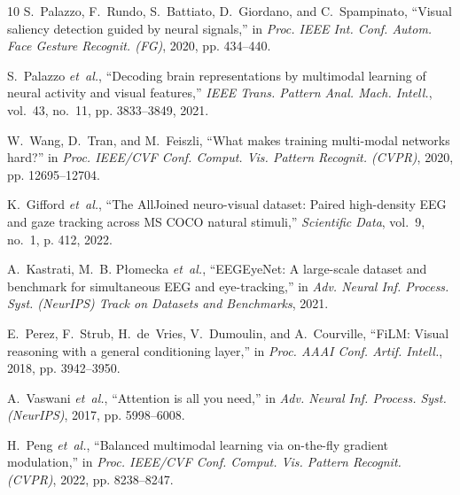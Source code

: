 \documentclass[journal,twocolumn]{IEEEtran}
\begin{document}
\begin{thebibliography}{10}
S.~Palazzo, F.~Rundo, S.~Battiato, D.~Giordano, and C.~Spampinato, ``Visual saliency detection guided by neural signals,'' in \emph{Proc. IEEE Int. Conf. Autom. Face Gesture Recognit. (FG)}, 2020, pp. 434--440.

S.~Palazzo \emph{et~al.}, ``Decoding brain representations by multimodal learning of neural activity and visual features,'' \emph{IEEE Trans. Pattern Anal. Mach. Intell.}, vol.~43, no.~11, pp. 3833--3849, 2021.

W.~Wang, D.~Tran, and M.~Feiszli, ``What makes training multi-modal networks hard?'' in \emph{Proc. IEEE/CVF Conf. Comput. Vis. Pattern Recognit. (CVPR)}, 2020, pp. 12695--12704.

K.~Gifford \emph{et~al.}, ``The {AllJoined} neuro-visual dataset: Paired high-density {EEG} and gaze tracking across {MS COCO} natural stimuli,'' \emph{Scientific Data}, vol.~9, no.~1, p. 412, 2022.

A.~Kastrati, M.~B. P{\l}omecka \emph{et~al.}, ``{EEGEyeNet}: A large-scale dataset and benchmark for simultaneous {EEG} and eye-tracking,'' in \emph{Adv. Neural Inf. Process. Syst. (NeurIPS) Track on Datasets and Benchmarks}, 2021.

E.~Perez, F.~Strub, H.~de~Vries, V.~Dumoulin, and A.~Courville, ``{FiLM}: Visual reasoning with a general conditioning layer,'' in \emph{Proc. AAAI Conf. Artif. Intell.}, 2018, pp. 3942--3950.

A.~Vaswani \emph{et~al.}, ``Attention is all you need,'' in \emph{Adv. Neural Inf. Process. Syst. (NeurIPS)}, 2017, pp. 5998--6008.

H.~Peng \emph{et~al.}, ``Balanced multimodal learning via on-the-fly gradient modulation,'' in \emph{Proc. IEEE/CVF Conf. Comput. Vis. Pattern Recognit. (CVPR)}, 2022, pp. 8238--8247.

\end{thebibliography}
\end{document}
